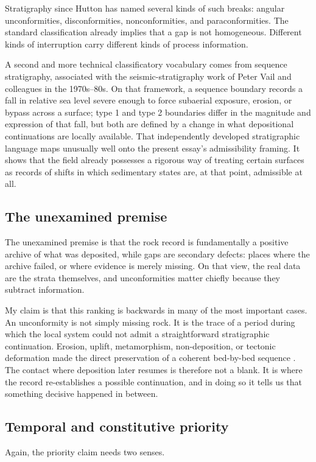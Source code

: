 \documentclass[11pt]{article}
\begin{document}
Stratigraphy since Hutton has named several kinds of such breaks: angular unconformities, disconformities, nonconformities, and paraconformities. The standard classification already implies that a gap is not homogeneous. Different kinds of interruption carry different kinds of process information.

A second and more technical classificatory vocabulary comes from sequence stratigraphy, associated with the seismic-stratigraphy work of Peter Vail and colleagues in the 1970s--80s. On that framework, a sequence boundary records a fall in relative sea level severe enough to force subaerial exposure, erosion, or bypass across a surface; type 1 and type 2 boundaries differ in the magnitude and expression of that fall, but both are defined by a change in what depositional continuations are locally available. That independently developed stratigraphic language maps unusually well onto the present essay's admissibility framing. It shows that the field already possesses a rigorous way of treating certain surfaces as records of shifts in which sedimentary states are, at that point, admissible at all.

\subsection{The unexamined premise}
The unexamined premise is that the rock record is fundamentally a positive archive of what was deposited, while gaps are secondary defects: places where the archive failed, or where evidence is merely missing. On that view, the real data are the strata themselves, and unconformities matter chiefly because they subtract information.

My claim is that this ranking is backwards in many of the most important cases. An unconformity is not simply missing rock. It is the trace of a period during which the local system could not admit a straightforward stratigraphic continuation. Erosion, uplift, metamorphism, non-deposition, or tectonic deformation made the direct preservation of a coherent bed-by-bed sequence \inadmissible. The contact where deposition later resumes is therefore not a blank. It is where the record re-establishes a possible continuation, and in doing so it tells us that something decisive happened in between.

\subsection{Temporal and constitutive priority}
Again, the priority claim needs two senses.
\end{document}
